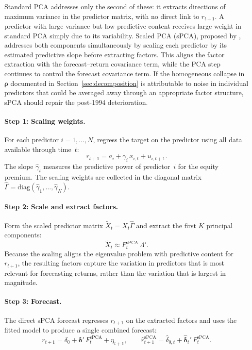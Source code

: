 \documentclass[a4paper,11pt]{article}
\begin{document}
Standard PCA addresses only the second of these: it extracts directions
of maximum variance in the predictor matrix, with no direct link to
$r_{t+1}$. A predictor with large variance but low predictive content
receives large weight in standard PCA simply due to its variability.
Scaled PCA (sPCA), proposed by \citet{huang2022scale}, addresses both
components simultaneously by scaling each predictor by its estimated
predictive slope before extracting factors. This aligns the factor
extraction with the forecast--return covariance term, while the PCA step
continues to control the forecast covariance term. If the homogeneous
collapse in $\boldsymbol{\rho}$ documented in
Section~\ref{sec:decomposition} is attributable to noise in individual
predictors that could be averaged away through an appropriate factor
structure, sPCA should repair the post-1994 deterioration.

\paragraph{Step 1: Scaling weights.} For each predictor
$i = 1, \ldots, N$, regress the target on the predictor using all data
available through time~$t$:
\begin{equation}\label{eq:scaling-reg}
    r_{t+1} = a_i + \gamma_i\, x_{i,t} + u_{i,t+1}.
\end{equation}
The slope $\hat{\gamma}_i$ measures the predictive power of predictor~$i$
for the equity premium. The scaling weights are collected in the diagonal
matrix $\hat{\Gamma} = \mathrm{diag}(\hat{\gamma}_1, \ldots, \hat{\gamma}_N)$.

\paragraph{Step 2: Scale and extract factors.} Form the scaled predictor
matrix $\tilde{X}_t = X_t \hat{\Gamma}$ and extract the first $K$
principal components:
\begin{equation}\label{eq:spca-factors}
    \tilde{X}_t \approx F_t^{\mathrm{sPCA}}\, \Lambda'.
\end{equation}
Because the scaling aligns the eigenvalue problem with predictive content
for $r_{t+1}$, the resulting factors capture the variation in predictors
that is most relevant for forecasting returns, rather than the variation
that is largest in magnitude.

\paragraph{Step 3: Forecast.} The direct sPCA forecast regresses $r_{t+1}$
on the extracted factors and uses the fitted model to produce a single
combined forecast:
\begin{equation}\label{eq:spca-forecast}
    r_{t+1} = \delta_0 + \boldsymbol{\delta}'\, F_t^{\mathrm{sPCA}} + \eta_{t+1},
    \qquad
    \hat{r}^{\mathrm{sPCA}}_{t+1}
    = \hat{\delta}_{0,t} + \hat{\boldsymbol{\delta}}_t'\, F_t^{\mathrm{sPCA}}.
\end{equation}
\end{document}
